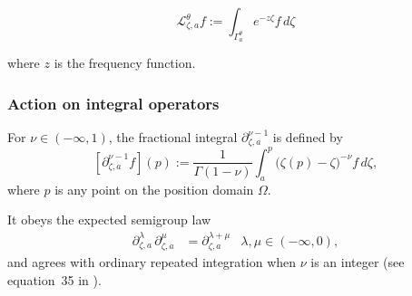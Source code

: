 \documentclass{article}
\theoremstyle{plain}
\newcommand{\R}{\mathbb{R}}
\newcommand{\laplace}{\mathcal{L}}
\newcommand{\fracderiv}[3]{\partial^{#1}_{#2, #3}}
\begin{document}
\begin{equation}\label{laplace:int} 
    \laplace_{\zeta, a}^{\theta} f := \int_{\Gamma_{a}^\theta} e^{-z\zeta} f\, d\zeta
\end{equation}

where $z$ is the frequency function. 



\subsubsection{Action on integral operators}\label{L-int-op}
For $\nu \in (-\infty, 1)$, the fractional integral $\partial^{\nu-1}_{\zeta, a}$ is defined by
\[ [\partial^{\nu-1}_{\zeta, a} f](p) := \frac{1}{\Gamma(1-\nu)} \int_{a}^p \big(\zeta(p)-\zeta\big)^{-\nu} f\,d\zeta, \]
where $p$ is any point on the position domain $\Omega$. 

It obeys the expected semigroup law \cite[Section  1.3]{mladenov2014advanced}
\begin{align*}
\fracderiv{\lambda}{\zeta}{a}\,\fracderiv{\mu}{\zeta}{a} & = \fracderiv{\lambda+\mu}{\zeta}{a} & \lambda, \mu \in (-\infty, 0),
\end{align*}
and agrees with ordinary repeated integration when $\nu$ is an integer (see equation~35 in \cite{mladenov2014advanced}).



\end{document}
